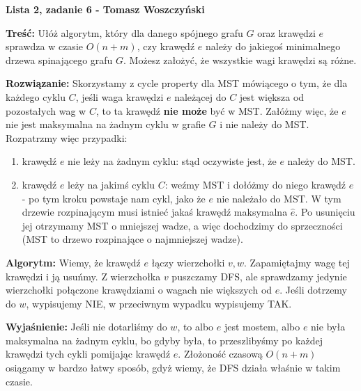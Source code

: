 \documentclass[a4paper,12pt]{article}
\begin{document}
\noindent \textbf{Lista 2, zadanie 6 - Tomasz Woszczyński}\newline

\noindent \newline \textbf{Treść:} Ułóż algorytm, który dla danego spójnego grafu $G$ oraz krawędzi $e$ sprawdza w czasie $O(n+m)$, czy krawędź $e$ należy do jakiegoś minimalnego drzewa spinającego grafu $G$. Możesz założyć, że wszystkie wagi krawędzi są różne. \newline

\noindent \textbf{Rozwiązanie:} Skorzystamy z cycle property dla MST mówiącego o tym, że dla każdego cyklu $C$, jeśli waga krawędzi $e$ należącej do $C$ jest większa od pozostałych wag w $C$, to ta krawędź \textbf{nie może} być w MST. Załóżmy więc, że $e$ nie jest maksymalna na żadnym cyklu w grafie $G$ i nie należy do MST. Rozpatrzmy więc przypadki:
\begin{enumerate}
\item krawędź $e$ nie leży na żadnym cyklu: stąd oczywiste jest, że $e$ należy do MST.
\item krawędź $e$ leży na jakimś cyklu $C$: weźmy MST i dołóżmy do niego krawędź $e$ - po tym kroku powstaje nam cykl, jako że $e$ nie należało do MST. W tym drzewie rozpinającym musi istnieć jakaś krawędź maksymalna $\hat{e}$. Po usunięciu jej otrzymamy MST o mniejszej wadze, a więc dochodzimy do sprzeczności (MST to drzewo rozpinające o najmniejszej wadze).
\end{enumerate}

\noindent \textbf{Algorytm:} Wiemy, że krawędź $e$ łączy wierzchołki $v, w$. Zapamiętajmy wagę tej krawędzi i ją usuńmy. Z wierzchołka $v$ puszczamy DFS, ale sprawdzamy jedynie wierzchołki połączone krawędziami o wagach nie większych od $e$. Jeśli dotrzemy do $w$, wypisujemy NIE, w przeciwnym wypadku wypisujemy TAK. \newline

\noindent \textbf{Wyjaśnienie:} Jeśli nie dotarliśmy do $w$, to albo $e$ jest mostem, albo $e$ nie była maksymalna na żadnym cyklu, bo gdyby była, to przeszlibyśmy po każdej krawędzi tych cykli pomijając krawędź $e$. Złożoność czasową $O(n+m)$ osiągamy w bardzo łatwy sposób, gdyż wiemy, że DFS działa właśnie w takim czasie.
\end{document}
